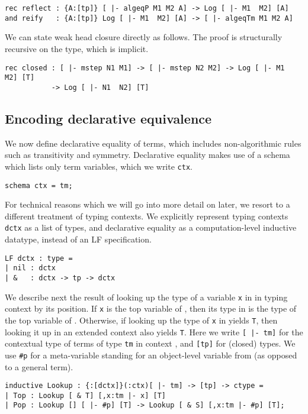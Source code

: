 \documentclass[copyright,creativecommons]{eptcs}
\begin{document}
\begin{lstlisting}
rec reflect : {A:[tp]} [ |- algeqP M1 M2 A] -> Log [ |- M1  M2] [A]
and reify   : {A:[tp]} Log [ |- M1  M2] [A] -> [ |- algeqTm M1 M2 A]
\end{lstlisting}

We can state weak head closure directly as follows. The proof is structurally
recursive on the type, which is implicit.

\begin{lstlisting}
rec closed : [ |- mstep N1 M1] -> [ |- mstep N2 M2] -> Log [ |- M1  M2] [T]
           -> Log [ |- N1  N2] [T]
\end{lstlisting}

\subsection{Encoding declarative equivalence}
We now define declarative equality of terms, which includes
non-algorithmic rules such as transitivity and symmetry. Declarative
equality makes use of a schema which lists only term variables, which we write
\lstinline{ctx}.

\begin{lstlisting}
schema ctx = tm;
\end{lstlisting}

For technical reasons which we will go into more detail on later, we resort to a
different treatment of typing contexts. We explicitly represent typing
contexts \lstinline{dctx} as a list of types, and declarative equality
as a computation-level inductive datatype, instead of an LF specification.

\begin{lstlisting}
LF dctx : type = 
| nil : dctx
| &   : dctx -> tp -> dctx \end{lstlisting}

We describe next the result of looking up the type of a variable \lstinline{x} in
 in typing context  by its position. If \lstinline{x}
is the top variable of , then its type in  is the type
of the top variable of . Otherwise, if looking up the type of
\lstinline{x} in  yields \lstinline{T}, then looking it up in
an extended context also yields \lstinline{T}. Here we write
\lstinline{[ |- tm]} for the contextual type of terms of
type \lstinline{tm} in context , and \lstinline{[tp]} for
(closed) types. We use \lstinline{#p} for a meta-variable standing
for an object-level variable from  (as opposed to a general term).

\begin{lstlisting}
inductive Lookup : {:[dctx]}(:ctx)[ |- tm] -> [tp] -> ctype =
| Top : Lookup [ & T] [,x:tm |- x] [T]
| Pop : Lookup [] [ |- #p] [T] -> Lookup [ & S] [,x:tm |- #p] [T];
\end{lstlisting}
\end{document}
